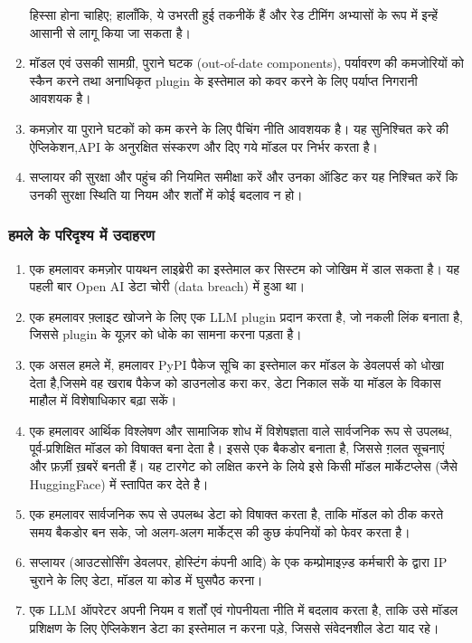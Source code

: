 \documentclass[
]{article}
\providecommand{\tightlist}{%
  \setlength{\itemsep}{0pt}\setlength{\parskip}{0pt}}
\begin{document}
\begin{enumerate}
  हिस्सा होना चाहिए; हालाँकि, ये उभरती हुई तकनीकें हैं और रेड टीमिंग अभ्यासों के रूप में
  इन्हें आसानी से लागू किया जा सकता है।
\item
  मॉडल एवं उसकी सामग्री, पुराने घटक (out-of-date components), पर्यावरण की
  कमजोरियों को स्कैन करने तथा अनाधिकृत plugin के इस्तेमाल को कवर करने के लिए
  पर्याप्त निगरानी आवशयक है।
\item
  कमज़ोर या पुराने घटकों को कम करने के लिए पैचिंग नीति आवशयक है। यह सुनिश्चित करे की
  ऐप्लिकेशन,API के अनुरक्षित संस्करण और दिए गये मॉडल पर निर्भर करता है।
\item
  सप्लायर की सुरक्षा और पहुंच की नियमित समीक्षा करें और उनका ऑडिट कर यह निश्चित
  करें कि उनकी सुरक्षा स्थिति या नियम और शर्तों में कोई बदलाव न हो।
\end{enumerate}

\subsubsection{हमले के परिदृश्य में
उदाहरण}\label{ux939ux92eux932-ux915-ux92aux930ux926ux936ux92f-ux92e-ux909ux926ux939ux930ux923}

\begin{enumerate}
\def\labelenumi{\arabic{enumi}.}
\tightlist
\item
  एक हमलावर कमज़ोर पायथन लाइब्रेरी का इस्तेमाल कर सिस्टम को जोखिम में डाल सकता
  है। यह पहली बार Open AI डेटा चोरी (data breach) में हुआ था।
\item
  एक हमलावर फ़्लाइट खोजने के लिए एक LLM plugin प्रदान करता है, जो नकली लिंक
  बनाता है, जिससे plugin के यूज़र को धोके का सामना करना पड़ता है।
\item
  एक असल हमले में, हमलावर PyPI पैकेज सूचि का इस्तेमाल कर मॉडल के डेवलपर्स को धोखा
  देता है,जिसमे वह खराब पैकेज को डाउनलोड करा कर, डेटा निकाल सकें या मॉडल के विकास
  माहौल में विशेषाधिकार बढ़ा सकें।
\item
  एक हमलावर आर्थिक विश्लेषण और सामाजिक शोध में विशेषज्ञता वाले सार्वजनिक रूप से
  उपलब्ध, पूर्व-प्रशिक्षित मॉडल को विषाक्त बना देता है। इससे एक बैकडोर बनाता है,
  जिससे ग़लत सूचनाएं और फ़र्ज़ी ख़बरें बनती हैं। यह टारगेट को लक्षित करने के लिये इसे किसी
  मॉडल मार्केटप्लेस (जैसे HuggingFace) में स्तापित कर देते है।
\item
  एक हमलावर सार्वजनिक रूप से उपलब्ध डेटा को विषाक्त करता है, ताकि मॉडल को ठीक
  करते समय बैकडोर बन सके, जो अलग-अलग मार्केट्स की कुछ कंपनियों को फेवर करता है।
\item
  सप्लायर (आउटसोर्सिंग डेवलपर, होस्टिंग कंपनी आदि) के एक कम्प्रोमाइज़्ड कर्मचारी के
  द्वारा IP चुराने के लिए डेटा, मॉडल या कोड में घुसपैठ करना।
\item
  एक LLM ऑपरेटर अपनी नियम व शर्तों एवं गोपनीयता नीति में बदलाव करता है, ताकि उसे
  मॉडल प्रशिक्षण के लिए ऐप्लिकेशन डेटा का इस्तेमाल न करना पड़े, जिससे संवेदनशील डेटा
  याद रहे।
\end{enumerate}
\end{document}
